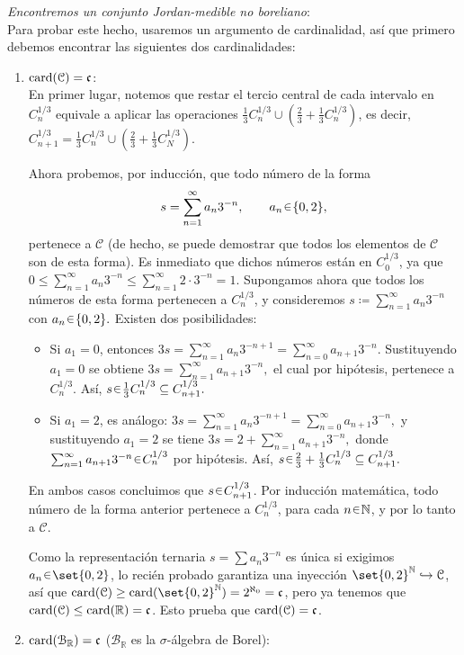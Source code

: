 \begin{sol}
\emph{Encontremos un conjunto Jordan-medible no boreliano}:\\
Para probar este hecho, usaremos un argumento de cardinalidad, así que primero debemos encontrar las siguientes dos cardinalidades:
\begin{enumerate}[label=(\alph*)]
\item %
$\operatorname{card}(\mathcal{C}) = \mathfrak{c}$:\\
En primer lugar, notemos que restar el tercio central de cada intervalo en $C^{1/3}_n$ equivale a aplicar las operaciones $\frac13C^{1/3}_n \cup (\frac23 + \frac13C^{1/3}_n)$, es decir, $C^{1/3}_{n+1} = \frac13C^{1/3}_n \cup (\frac23 + \frac13C^{1/3}_N)$.\par
Ahora probemos, por inducción, que todo número de la forma 
\[
    s = \sum_{n=1}^\infty a_n 3^{-n}, 
    \qquad a_n \en \{0,2\},
\]
pertenece a $\mathcal{C}$ (de hecho, se puede demostrar que todos los elementos de $\mathcal{C}$ son de esta forma).  
Es inmediato que dichos números están en $C^{1/3}_0$, ya que
$
    0 \leq \sum_{n=1}^\infty a_n 3^{-n} 
      \leq \sum_{n=1}^\infty 2 \cdot 3^{-n} 
      = 1.
$
Supongamos ahora que todos los números de esta forma pertenecen a $C^{1/3}_n$, y consideremos
$
    s \coloneq \sum_{n=1}^\infty a_n 3^{-n}$ con $
    a_n \en \{0,2\}.
$
Existen dos posibilidades:
\begin{itemize}
    \item Si $a_1 = 0$, entonces
    $
        3s = \sum_{n=1}^\infty a_n 3^{-n+1} 
            = \sum_{n=0}^\infty a_{n+1} 3^{-n}.
    $
    Sustituyendo $a_1=0$ se obtiene
    $
        3s = \sum_{n=1}^\infty a_{n+1} 3^{-n},
    $
    el cual por hipótesis, pertenece a $C^{1/3}_n$. Así,
    $
        s \en \tfrac{1}{3}C^{1/3}_n \subseteq C^{1/3}_{n+1}.
    $

    \item Si $a_1 = 2$, es análogo:
    $
        3s = \sum_{n=1}^\infty a_n 3^{-n+1} 
            = \sum_{n=0}^\infty a_{n+1} 3^{-n},
    $
    y sustituyendo $a_1=2$ se tiene
    $
        3s = 2 + \sum_{n=1}^\infty a_{n+1} 3^{-n},
    $
    donde $\sum_{n=1}^\infty a_{n+1} 3^{-n} \en C^{1/3}_n$ por hipótesis. Así,
    $
        s \en \tfrac{2}{3} + \tfrac{1}{3}C^{1/3}_n \subseteq C^{1/3}_{n+1}.
    $
\end{itemize}
En ambos casos concluimos que $s \en C^{1/3}_{n+1}$. Por inducción matemática, todo número de la forma anterior pertenece a $C^{1/3}_n$, para cada $n\en\mathbb{N}$, y por lo tanto a $\mathcal{C}$.\par
Como la representación ternaria $s=\sum a_n3^{-n}$ es única si exigimos $a_n\en\set{0,2}$, lo recién probado garantiza una inyección $\set{0,2}^\mathbb{N} \hookrightarrow \mathcal{C}$, así que $\card(\mathcal{C}) \geq \card(\set{0,2}^\mathbb{N}) = 2^{\aleph_0} = \mathfrak{c}$, pero ya tenemos que $\operatorname{card}(\mathcal{C}) \leq \operatorname{card}(\mathbb{R}) = \mathfrak{c}$. Esto prueba que $\operatorname{card}(\mathcal{C}) = \mathfrak{c}$.
\item %
$\operatorname{card}(\mathcal{B}_\mathbb{R}) = \mathfrak{c}$ ($\mathcal{B}_\mathbb{R}$ es la $\sigma$-álgebra de Borel):


\end{enumerate}
\end{sol}
